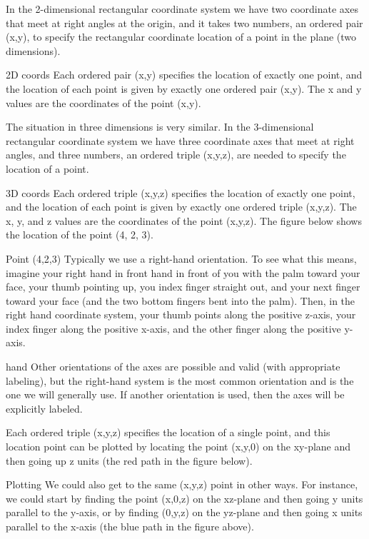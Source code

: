 In the 2-dimensional rectangular coordinate system we have two coordinate axes that meet at right angles at the origin, and it takes two numbers, an ordered pair (x,y), to specify the rectangular coordinate location of a point in the plane (two dimensions).

2D coords
Each ordered pair (x,y) specifies the location of exactly one point, and the location of each point is given by exactly one ordered pair (x,y). The x and y values are the coordinates of the point (x,y).

The situation in three dimensions is very similar. In the 3-dimensional rectangular coordinate system we have three coordinate axes that meet at right angles, and three numbers, an ordered triple (x,y,z), are needed to specify the location of a point.

3D coords
Each ordered triple (x,y,z) specifies the location of exactly one point, and the location of each point is given by exactly one ordered triple (x,y,z). The x, y, and z values are the coordinates of the point (x,y,z). The figure below shows the location of the point (4, 2, 3).

Point (4,2,3)
Typically we use a right-hand orientation. To see what this means, imagine your right hand in front hand in front of you with the palm toward your face, your thumb pointing up, you index finger straight out, and your next finger toward your face (and the two bottom fingers bent into the palm). Then, in the right hand coordinate system, your thumb points along the positive z-axis, your index finger along the positive x-axis, and the other finger along the positive y-axis.

hand
Other orientations of the axes are possible and valid (with appropriate labeling), but the right-hand system is the most common orientation and is the one we will generally use. If another orientation is used, then the axes will be explicitly labeled.

Each ordered triple (x,y,z) specifies the location of a single point, and this location point can be plotted by locating the point (x,y,0) on the xy-plane and then going up z units (the red path in the figure below).

Plotting
We could also get to the same (x,y,z) point in other ways. For instance, we could start by finding the point (x,0,z) on the xz-plane and then going y units parallel to the y-axis, or by finding (0,y,z) on the yz-plane and then going x units parallel to the x-axis (the blue path in the figure above).

